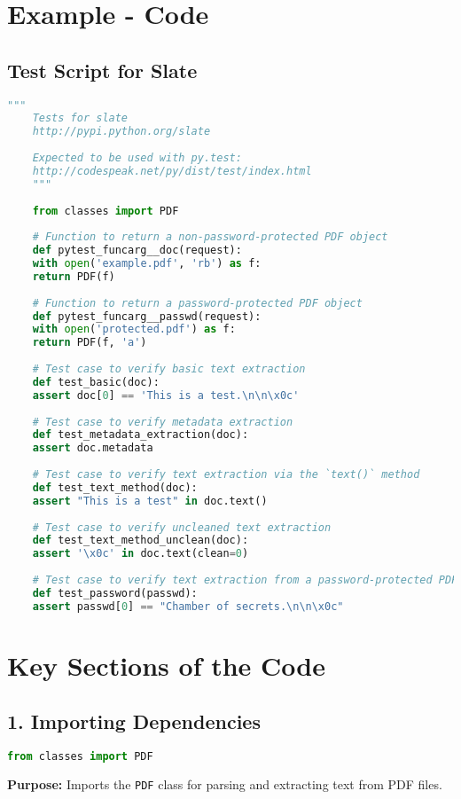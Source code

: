 \section{Example - Code}
\subsection{Test Script for Slate}
\begin{lstlisting}[language=Python, caption=Test Script for Slate]
	"""
	Tests for slate
	http://pypi.python.org/slate
	
	Expected to be used with py.test:
	http://codespeak.net/py/dist/test/index.html
	"""
	
	from classes import PDF
	
	# Function to return a non-password-protected PDF object
	def pytest_funcarg__doc(request):
	with open('example.pdf', 'rb') as f:
	return PDF(f)
	
	# Function to return a password-protected PDF object
	def pytest_funcarg__passwd(request):
	with open('protected.pdf') as f:
	return PDF(f, 'a')
	
	# Test case to verify basic text extraction
	def test_basic(doc):
	assert doc[0] == 'This is a test.\n\n\x0c'
	
	# Test case to verify metadata extraction
	def test_metadata_extraction(doc):
	assert doc.metadata
	
	# Test case to verify text extraction via the `text()` method
	def test_text_method(doc):
	assert "This is a test" in doc.text()
	
	# Test case to verify uncleaned text extraction
	def test_text_method_unclean(doc):
	assert '\x0c' in doc.text(clean=0)
	
	# Test case to verify text extraction from a password-protected PDF
	def test_password(passwd):
	assert passwd[0] == "Chamber of secrets.\n\n\x0c"
\end{lstlisting}

\section{Key Sections of the Code}

\subsection{1. Importing Dependencies}
\begin{lstlisting}[language=Python]
	from classes import PDF
\end{lstlisting}
\textbf{Purpose:} Imports the \texttt{PDF} class for parsing and extracting text from PDF files.

